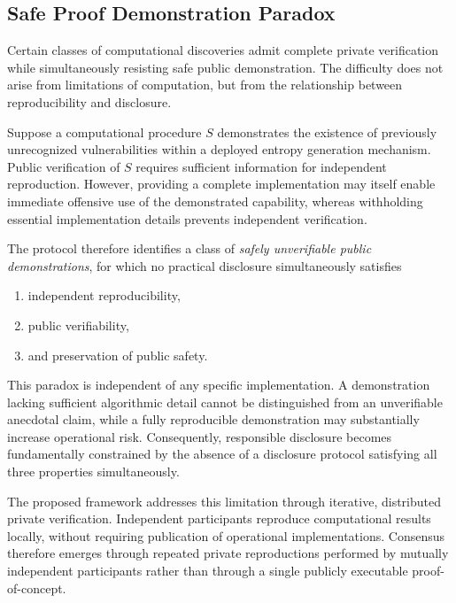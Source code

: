 \documentclass[11pt]{article}
\begin{document}

\subsection{Safe Proof Demonstration Paradox}

Certain classes of computational discoveries admit complete private
verification while simultaneously resisting safe public demonstration.
The difficulty does not arise from limitations of computation,
but from the relationship between reproducibility and disclosure.

Suppose a computational procedure \(S\) demonstrates the existence of
previously unrecognized vulnerabilities within a deployed entropy
generation mechanism.
Public verification of \(S\) requires sufficient information for
independent reproduction.
However,
providing a complete implementation may itself enable immediate
offensive use of the demonstrated capability,
whereas withholding essential implementation details prevents
independent verification.

The protocol therefore identifies a class of
\emph{safely unverifiable public demonstrations},
for which no practical disclosure simultaneously satisfies

\begin{enumerate}

\item independent reproducibility,

\item public verifiability,

\item and preservation of public safety.

\end{enumerate}

This paradox is independent of any specific implementation.
A demonstration lacking sufficient algorithmic detail cannot be
distinguished from an unverifiable anecdotal claim,
while a fully reproducible demonstration may substantially increase
operational risk.
Consequently,
responsible disclosure becomes fundamentally constrained by the absence
of a disclosure protocol satisfying all three properties
simultaneously.

The proposed framework addresses this limitation through iterative,
distributed private verification.
Independent participants reproduce computational results locally,
without requiring publication of operational implementations.
Consensus therefore emerges through repeated private reproductions
performed by mutually independent participants rather than through a
single publicly executable proof-of-concept.
\end{document}
